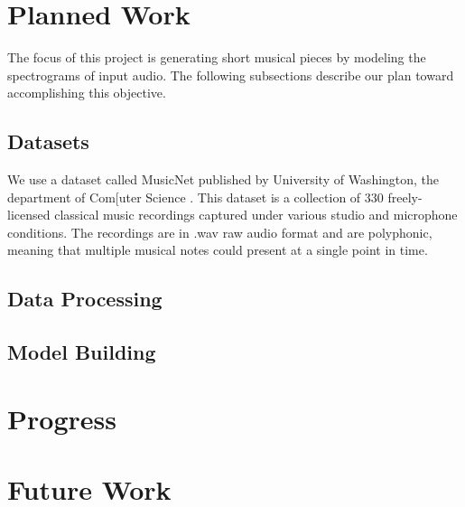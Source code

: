 \documentclass[sigconf,authorversion]{acmart}
\begin{document}
\section{Planned Work}
The focus of this project is generating short musical pieces by modeling the spectrograms of input audio. The
following subsections describe our plan toward accomplishing this objective.

\subsection{Datasets}
We use a dataset called MusicNet published by University of Washington, the department of Com[uter Science 
\cite{thickstun2017learning}. This dataset is a collection of 330 freely-licensed classical music recordings 
captured under various studio and microphone conditions. The recordings are in .wav raw audio format and are
polyphonic, meaning that multiple musical notes could present at a single point in time.

\subsection{Data Processing}


\subsection{Model Building}

\section{Progress}


\section{Future Work}



\end{document}
